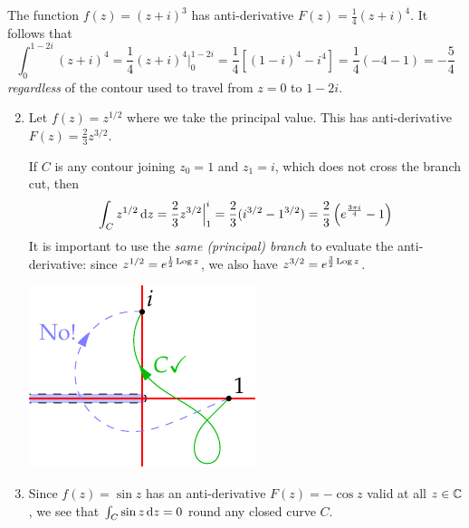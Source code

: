 
\begin{examples}{}{}
	\exstart The function $f(z)=(z+i)^3$ has anti-derivative $F(z)=\frac 14(z+i)^4$. It follows that
	\[
		\int_0^{1-2i}(z+i)^4=\frac 14(z+i)^4\Big|_0^{1-2i}=\frac 14\left[(1-i)^4-i^4\right]=\frac 14(-4-1)=-\frac 54
	\]
	\emph{regardless} of the contour used to travel from $z=0$ to $1-2i$.

	\begin{enumerate}\setcounter{enumi}{1}
		\item Let $f(z)=z^{1/2}$ where we take the principal value. This has anti-derivative $F(z)=\frac 23z^{3/2}$.\par
		\begin{minipage}[t]{0.7\linewidth}\vspace{-10pt}
			If $C$ is any contour joining $z_0=1$ and $z_1=i$, which does not cross the branch cut, then
	  	\[
	  		\int_Cz^{1/2}\,{\mathrm{d} z}=\frac 23z^{3/2}\Big|_1^i=\frac 23(i^{3/2}-1^{3/2})=\frac 23\left(e^{\frac{3\pi i}{4}}-1\right)
	  	\]
	  	It is important to use the \emph{same (principal) branch} to evaluate the anti-derivative: since $z^{1/2}=e^{\frac 12\operatorname{Log} z}$, we also have $z^{3/2}=e^{\frac 32\operatorname{Log} z}$.
		\end{minipage}
		\hfill
		\begin{minipage}[t]{0.29\linewidth}\vspace{-10pt}
			\flushright\includegraphics{contour-branch5}
		\end{minipage}
	  
	  \item Since $f(z)=\sin z$ has an anti-derivative $F(z)=-\cos z$ valid at all $z\in\mathbb{C}$, we see that $\int_C\sin z\,{\mathrm{d} z}=0$ round any closed curve $C$.
	  

\end{enumerate}
\end{examples}
